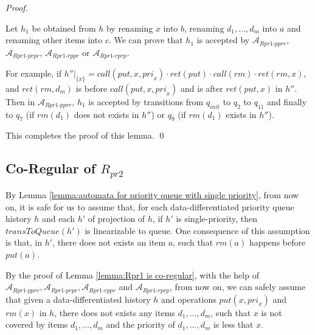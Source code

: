 \begin {proof}
\begin{itemize}
    Let $h_1$ be obtained from $h$ by renaming $x$ into $b$, renaming $d_1,\ldots,d_m$ into $a$ and renaming other items into $c$. We can prove that $h_1$ is accepted by $\mathcal{A}_{\textit{Rpr1-pprr}}$, $\mathcal{A}_{\textit{Rpr1-prpr}}$, $\mathcal{A}_{\textit{Rpr1-rppr}}$ or $\mathcal{A}_{\textit{Rpr1-rprp}}$.

    For example, if $h'' \vert_{ \{ x \} } = \textit{call}(\textit{put},x,\textit{pri}_x) \cdot \textit{ret}(\textit{put}) \cdot \textit{call}(\textit{rm}) \cdot \textit{ret}(\textit{rm},x)$, and $\textit{ret}(\textit{rm},d_m)$ is before $\textit{call}(\textit{put},x,\textit{pri}_x)$ and is after $\textit{ret}(\textit{put},x)$ in $h''$. Then in  $\mathcal{A}_{\textit{Rpr1-pprr}}$, $h_1$ is accepted by transitions from $q_{\textit{init}}$ to $q_2$ to $q_{11}$ and finally to $q_7$ (if $\textit{rm}(d_1)$ does not exists in $h''$) or $q_9$ (if $\textit{rm}(d_1)$ exists in $h''$).
\end{itemize}

This completes the proof of this lemma. \qed
\end {proof}




\subsection{Co-Regular of $R_{\textit{pr2}}$}
\label{subsec:co-regular of Rpr2}



By Lemma \ref{lemma:automata for priority queue with single priority}, from now on, it is safe for us to assume that, for each data-differentiated priority queue history $h$ and each $h'$ of projection of $h$, if $h'$ is single-priority, then $\textit{transToQueue}(h')$ is linearizable to queue. One consequence of this assumption is that, in $h'$, there does not exists an item $a$, such that $\textit{rm}(a)$ happens before $\textit{put}(a)$.

By the proof of Lemma \ref{lemma:Rpr1 is co-regular}, with the help of $\mathcal{A}_{\textit{Rpr1-pprr}}, \mathcal{A}_{\textit{Rpr1-prpr}}, \mathcal{A}_{\textit{Rpr1-rppr}}$ and $\mathcal{A}_{\textit{Rpr1-rprp}}$, from now on, we can safely assume that given a data-differentiated history $h$ and operations $\textit{put}(x,\textit{pri}_x)$ and $\textit{rm}(x)$ in $h$, there does not exists any items $d_1,\ldots,d_m$, such that $x$ is not covered by items $d_1,\ldots,d_m$ and the priority of $d_1,\ldots,d_m$ is less that $x$.


